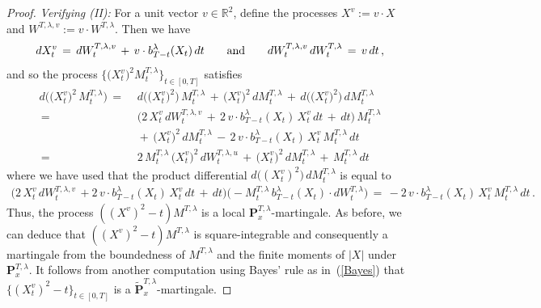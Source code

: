 \documentclass[10pt]{article}
\numberwithin{equation}{section}
\theoremstyle{definition}
\newcommand{\R}{{\mathbb R}}
\begin{document}
\begin{proof}
 \noindent \textit{Verifying (II):}
For a unit vector $v\in \R^2$, define the processes $X^{v}:=v\cdot X  $ and $ W^{T,\lambda,v}:=v\cdot W^{T,\lambda}$.  Then we have
$$dX_t^{v}\,= \, dW_{t}^{T,\lambda,v}\,+\,v\cdot b^{\lambda}_{T-t}(X_t)\,dt \hspace{.7cm}\text{and}\hspace{.7cm} dW_{t}^{T,\lambda,v}\, dW_{t}^{T,\lambda}\,=\,v\,dt\,,  $$ and so the process $\big\{ \big(X_{t}^{v}\big)^2 M_{t}^{T,\lambda} \big\}_{t\in [0,T]}$  satisfies 
  \begin{align*}
     d\Big( \big(X_{t}^{v}\big)^2 \,M_{t}^{T,\lambda}\Big)\,=\,& \, d\Big(\big(X_{t}^{v}\big)^2\Big)\, M_{t}^{T,\lambda}\,+\,  \big(X_{t}^{v}\big)^2\, d M_{t}^{T,\lambda}\,+\,d\Big(\big(X_{t}^{v}\big)^2\Big)\, dM_{t}^{T,\lambda}\\
     \,=\,& \,\Big(2\, X_{t}^{v}\, dW_{t}^{T,\lambda,v}\,+\, 2\,v\cdot b^{\lambda}_{T-t}(X_t)\, X_{t}^{v}\,dt  \,+\,dt \Big)\, M_{t}^{T,\lambda} \\ &\,+\, \big(X_{t}^{v}\big)^2 \, d M_{t}^{T,\lambda}\,-\,2 \,v\cdot b^{\lambda}_{T-t}(X_t)\,X_{t}^{v}\,M_{t}^{T,\lambda}\, dt   \\ \,=\,&\, 2\,M_{t}^{T,\lambda}\,\big(X_{t}^{v}\big)^2\, dW_{t}^{T,\lambda,u} \,+\, \big(X_{t}^{v}\big)^2\, d M_{t}^{T,\lambda}\,+\,M_{t}^{T,\lambda}\,dt
  \end{align*}
  where we have used that the product differential $d\big((X_{t}^{v})^2\big)\, dM_{t}^{T,\lambda} $ is equal to
   \begin{align*}
\Big(2\, X_{t}^{v}\, dW_{t}^{T,\lambda,v}\,+ 2 \,v\cdot b^{\lambda}_{T-t}(X_t)\,X_{t}^{v}\,dt  \,+\,dt \Big)\Big( -M_{t}^{T,\lambda}\, b_{T-t}^{\lambda}(X_t)\cdot dW_{t}^{T,\lambda}\Big) \,=\, -2 \,v\cdot b^{\lambda}_{T-t}(X_t)\,X_{t}^{v}\,M_{t}^{T,\lambda}\, dt \,.
\end{align*}
  Thus, the process $((X^{v})^2 -t)M^{T,\lambda} $ is a local $\mathbf{P}_{x }^{T,\lambda }$-martingale. As before, we can deduce that $((X^{v})^2 -t)M^{T,\lambda} $ is square-integrable and consequently a martingale  from the boundedness of $M^{T,\lambda}$ and the finite moments of $|X|$ under $\mathbf{P}_{x }^{T,\lambda }$.   It follows from another computation using Bayes' rule as in~(\ref{Bayes})   that $\{(X_{t}^{v})^2 -t\}_{t\in [0,T]}$ is a $\mathbf{\widetilde{P}}_{x  }^{T,\lambda}$-martingale.  \vspace{.3cm}



\end{proof}
\end{document}
